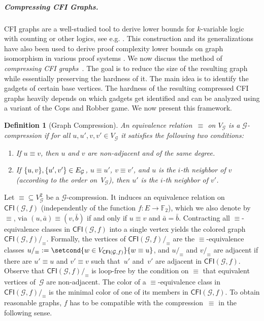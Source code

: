 \documentclass[10pt,a4paper]{article}
\newcommand{\defining}[1]{\emph{#1}}
\DeclarePairedDelimiter\set{\lbrace}{\rbrace}
\newcommand{\comp}{\equiv}
\newcommand{\CFIsym}{\mathsf{CFI}}
\newcommand{\CFI}[1]{\CFIsym(#1)}
\newcommand{\compCFI}[2]{\CFI{#1}/_{#2}}
\newcommand{\FF}{\mathbb{F}}
\newcommand{\tup}[1]{\bar{#1}}
\newcommand{\graphG}{\mathcal{G}}
\newcommand{\vertexG}{V_{\graphG}}
\newcommand{\edgeG}{E_{\graphG}}
\newtheorem{definition}[theorem]{Definition}
\begin{document}
\subparagraph*{Compressing CFI Graphs.}

CFI graphs are a well-studied tool to derive lower bounds for
$k$-variable logic with counting or other logics, see e.g.
\cite{CaiFuererImmerman1992, Furer2001, BerkholzNordstrom16,
DawarGraedelLichter22, Lichter2023b}. This construction and its
generalizations have also been used to derive proof complexity lower bounds on graph isomorphism in various
proof systems
\cite{DBLP:conf/sat/Toran13,DBLP:conf/icalp/BerkholzG15,DBLP:conf/soda/BerkholzG17,DBLP:conf/soda/ODonnellWWZ14,DBLP:conf/sat/ToranW23,SchweitzerSeebach21}.
We now discuss the method of \emph{compressing CFI graphs}~\cite{DBLP:conf/focs/GroheLNS23}.
The goal is to reduce the size of the resulting graph
while essentially preserving the hardness of it.
The main idea is to identify the gadgets of certain base vertices.
The hardness of the resulting compressed CFI graphs
heavily depends on which gadgets get identified
and can be analyzed using a variant of the Cops and Robber game.
We now present this framework.

\begin{definition}[Graph Compression]
        An equivalence relation~$\comp$ on $\vertexG$ is a \defining{$\graphG$-compression} if for all $u,u',v, v' \in \vertexG$ it satisfies the following two conditions:
        \begin{enumerate}
                \item If $u \comp v$, then
                $u$ and $v$ are non-adjacent and of the same degree.
                \item \label{itm:compression-order-agree} If $\set{u,v},\set{u',v'} \in \edgeG$, $u \comp u'$, $v \comp v'$, and $u$ is the $i$-th neighbor of $v$ (according to the order on~$\vertexG$), then $u'$ is the $i$-th neighbor of $v'$.
        \end{enumerate}
\end{definition}
 
\noindent Let ${\comp} \subseteq \vertexG^2$ be a $\graphG$-compression.
It induces an equivalence relation on $\CFI{\graphG,f}$ (independently of the function $f \colon E \to \FF_2$), which we also denote by $\comp$, via
$(u, \tup{a}) \comp (v, \tup{b})$
if and only if $u \comp v$ and $\tup{a} = \tup{b}$.
Contracting all $\comp$\nobreakdash-equivalence classes in $\CFI{\graphG,f}$ into a single vertex yields the colored graph $\compCFI{\graphG,f}{\comp}$.
Formally, the vertices of $\compCFI{\graphG,f}{\comp}$ are the $\comp$-equivalence classes $u/_{\comp} := \setcond{w \in V_{\CFI{\graphG,f}}}{w \comp u}$,
and $u/_\comp$ and $v/_\comp$ are adjacent
if there are $u'\comp u$ and $v'\comp v$ such that~$u'$ and~$v'$ are adjacent in $\CFI{\graphG,f}$.
Observe that $\compCFI{\graphG,f}{\comp}$ is loop-free by the condition on $\comp$ that equivalent vertices of~$\graphG$ are non-adjacent.
The color of a $\comp$\nobreakdash-equivalence class in $\compCFI{\graphG,f}{\comp}$ is the minimal color of one of its members in $\CFI{\graphG,f}$.
To obtain reasonable graphs, $f$ has to be compatible with the compression~$\comp$ in the following sense.
\end{document}
